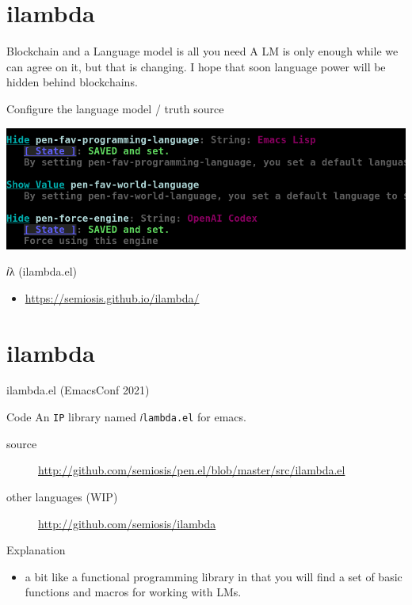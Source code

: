 \documentclass[presentation]{beamer}
\begin{document}
\section{ilambda}
\label{sec:orgc3af3f5}
\begin{frame}[label={sec:orge9f98a5}]{Blockchain and a Language model is all you need}
A LM is only enough while we can agree on it,
but that is changing. I hope that soon
language power will be hidden behind
blockchains.

\begin{block}{Configure the language model / truth source}
\begin{center}
\includegraphics[width=.9\linewidth]{./configure-model.png}
\end{center}
\end{block}

\begin{block}{𝑖λ (ilambda.el)}
\begin{itemize}
\item \url{https://semiosis.github.io/ilambda/}
\end{itemize}
\end{block}
\end{frame}

\section{ilambda}
\label{sec:org77ef8f0}
\begin{frame}[label={sec:orgae9e1a4},fragile]{ilambda.el (EmacsConf 2021)}
 \begin{block}{Code}
An \texttt{IP} library named \texttt{𝑖lambda.el} for emacs.

\begin{description}
\item[{source}] \url{http://github.com/semiosis/pen.el/blob/master/src/ilambda.el}
\item[{other languages (WIP)}] \url{http://github.com/semiosis/ilambda}
\end{description}
\end{block}

\begin{block}{Explanation}
\begin{itemize}
\item a bit like a functional programming library
in that you will find a set of basic functions and
macros for working with LMs.
\end{itemize}
\end{block}
\end{frame}
\end{document}
